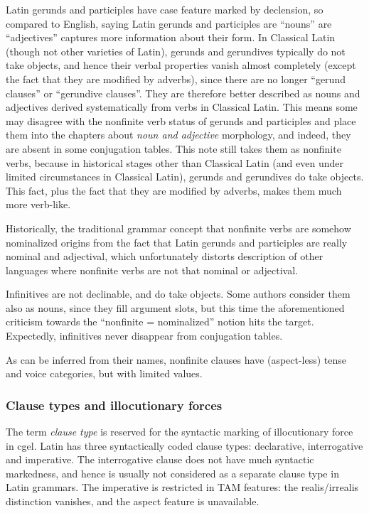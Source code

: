 \documentclass{article}
\newcommand*{\term}[1]{\emph{#1}}
\begin{document}
Latin gerunds and participles have case feature marked by declension,
so compared to English, saying Latin gerunds and participles are ``nouns'' are ``adjectives''
captures more information about their form.
In Classical Latin (though not other varieties of Latin), 
gerunds and gerundives typically do not take objects,
and hence their verbal properties vanish almost completely
(except the fact that they are modified by adverbs),
since there are no longer ``gerund clauses'' or ``gerundive clauses''.
They are therefore better described as nouns and adjectives derived systematically from verbs
in Classical Latin.
This means some may disagree with the nonfinite verb status of gerunds and participles
and place them into the chapters about \emph{noun and adjective} morphology,
and indeed, they are absent in some conjugation tables.
This note still takes them as nonfinite verbs,
because in historical stages other than Classical Latin (and even under limited circumstances in Classical Latin),
gerunds and gerundives do take objects.
This fact, plus the fact that they are modified by adverbs,
makes them much more verb-like.

Historically, the traditional grammar concept that nonfinite verbs are somehow nominalized origins from the fact 
that Latin gerunds and participles are really nominal and adjectival,
which unfortunately distorts description of other languages 
where nonfinite verbs are not that nominal or adjectival.

Infinitives are not declinable, and do take objects.
Some authors consider them also as nouns, since they fill argument slots, 
but this time the aforementioned criticism towards the ``nonfinite = nominalized'' notion hits the target.
Expectedly, infinitives never disappear from conjugation tables. 

As can be inferred from their names, nonfinite clauses have (aspect-less) tense and voice categories,
but with limited values.

\subsubsection{Clause types and illocutionary forces}\label{sec:force-abs}

The term \term{clause type} is reserved for the syntactic marking of illocutionary force in \ac{cgel}.
Latin has three syntactically coded clause types:
declarative, interrogative and imperative.
The interrogative clause does not have much syntactic markedness,
and hence is usually not considered as a separate clause type in Latin grammars.
The imperative is restricted in TAM features:
the realis/irrealis distinction vanishes,
and the aspect feature is unavailable.
\end{document}
